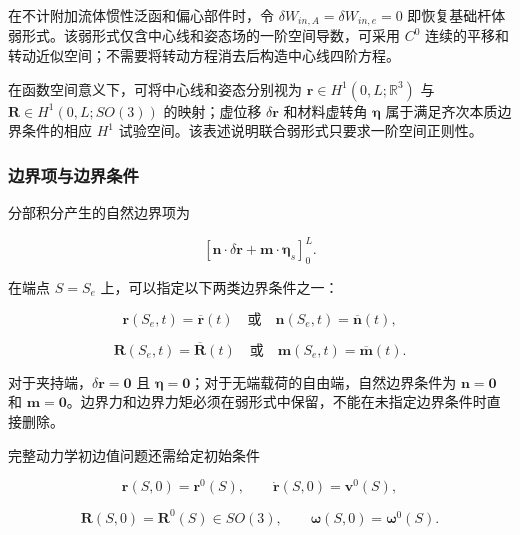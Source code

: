 在不计附加流体惯性泛函和偏心部件时，令 \(\delta W_{in,A} = \delta W_{in,e} = 0\) 即恢复基础杆体弱形式。该弱形式仅含中心线和姿态场的一阶空间导数，可采用 \(C^{0}\) 连续的平移和转动近似空间；不需要将转动方程消去后构造中心线四阶方程。

在函数空间意义下，可将中心线和姿态分别视为 \(\mathbf{r} \in H^{1}\left( 0,L;\mathbb{R}^{3} \right)\) 与 \(\mathbf{R} \in H^{1}\left( 0,L;SO(3) \right)\) 的映射；虚位移 \(\delta\mathbf{r}\) 和材料虚转角 \(\bm{\eta}\) 属于满足齐次本质边界条件的相应 \(H^{1}\) 试验空间。该表述说明联合弱形式只要求一阶空间正则性。

\subsubsection{边界项与边界条件}\label{sec:rod-1-5-5}

分部积分产生的自然边界项为

\begin{equation}
\label{eq:rod-1-92}
\left\lbrack \mathbf{n} \cdot \delta\mathbf{r} + \mathbf{m} \cdot \bm{\eta}_{s} \right\rbrack_{0}^{L}.
\end{equation}

在端点 \(S = S_{e}\) 上，可以指定以下两类边界条件之一：

\begin{equation}
\label{eq:rod-1-93}
\mathbf{r}\left( S_{e},t \right) = \overline{\mathbf{r}}(t)\quad\text{或}\quad\mathbf{n}\left( S_{e},t \right) = \overline{\mathbf{n}}(t),
\end{equation}

\begin{equation}
\label{eq:rod-1-94}
\mathbf{R}\left( S_{e},t \right) = \overline{\mathbf{R}}(t)\quad\text{或}\quad\mathbf{m}\left( S_{e},t \right) = \overline{\mathbf{m}}(t).
\end{equation}

对于夹持端，\(\delta\mathbf{r} = \mathbf{0}\) 且 \(\bm{\eta} = \mathbf{0}\)；对于无端载荷的自由端，自然边界条件为 \(\mathbf{n} = \mathbf{0}\) 和 \(\mathbf{m} = \mathbf{0}\)。边界力和边界力矩必须在弱形式中保留，不能在未指定边界条件时直接删除。

完整动力学初边值问题还需给定初始条件

\begin{equation}
\label{eq:rod-1-95}
\mathbf{r}(S,0) = \mathbf{r}^{0}(S),\quad\quad\dot{\mathbf{r}}(S,0) = \mathbf{v}^{0}(S),
\end{equation}

\begin{equation}
\label{eq:rod-1-96}
\mathbf{R}(S,0) = \mathbf{R}^{0}(S) \in SO(3),\quad\quad\bm{\omega}(S,0) = \bm{\omega}^{0}(S).
\end{equation}

